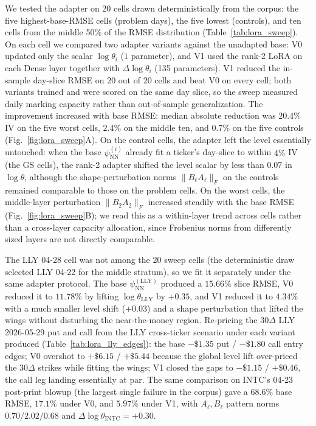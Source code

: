 We tested the adapter on 20 cells drawn deterministically from the corpus: the five highest-base-RMSE cells (problem days), the five lowest (controls), and ten cells from the middle 50\% of the RMSE distribution (Table~\ref{tab:lora_sweep}). On each cell we compared two adapter variants against the unadapted base: V0 updated only the scalar $\log\theta_i$ ($1$ parameter), and V1 used the rank-2 LoRA on each Dense layer together with $\Delta\log\theta_i$ (135 parameters). V1 reduced the in-sample day-slice RMSE on $20$ out of $20$ cells and beat V0 on every cell; both variants trained and were scored on the same day slice, so the sweep measured daily marking capacity rather than out-of-sample generalization. The improvement increased with base RMSE: median absolute reduction was $20.4\%$ IV on the five worst cells, $2.4\%$ on the middle ten, and $0.7\%$ on the five controls (Fig.~\ref{fig:lora_sweep}A). On the control cells, the adapter left the level essentially untouched: when the base $\psi_{\text{NN}}^{(i)}$ already fit a ticker's day-slice to within $4\%$ IV (the GS cells), the rank-2 adapter shifted the level scalar by less than $0.07$ in $\log\theta$, although the shape-perturbation norms $\|B_\ell A_\ell\|_F$ on the controls remained comparable to those on the problem cells. On the worst cells, the middle-layer perturbation $\|B_2 A_2\|_F$ increased steadily with the base RMSE (Fig.~\ref{fig:lora_sweep}B); we read this as a within-layer trend across cells rather than a cross-layer capacity allocation, since Frobenius norms from differently sized layers are not directly comparable.

The LLY 04-28 cell was not among the 20 sweep cells (the deterministic draw selected LLY 04-22 for the middle stratum), so we fit it separately under the same adapter protocol. The base $\psi_{\text{NN}}^{(\text{LLY})}$ produced a $15.66\%$ slice RMSE, V0 reduced it to $11.78\%$ by lifting $\log\theta_{\text{LLY}}$ by $+0.35$, and V1 reduced it to $4.34\%$ with a much smaller level shift ($+0.03$) and a shape perturbation that lifted the wings without disturbing the near-the-money region. Re-pricing the $30\Delta$ LLY 2026-05-29 put and call from the LLY cross-ticker scenario under each variant produced (Table~\ref{tab:lora_lly_edges}): the base $-\$1.35$ put / $-\$1.80$ call entry edges; V0 overshot to $+\$6.15$ / $+\$5.44$ because the global level lift over-priced the $30\Delta$ strikes while fitting the wings; V1 closed the gaps to $-\$1.15$ / $+\$0.46$, the call leg landing essentially at par. The same comparison on INTC's 04-23 post-print blowup (the largest single failure in the corpus) gave a $68.6\%$ base RMSE, $17.1\%$ under V0, and $5.97\%$ under V1, with $A_\ell, B_\ell$ pattern norms $0.70 / 2.02 / 0.68$ and $\Delta\log\theta_{\text{INTC}} = +0.30$.

